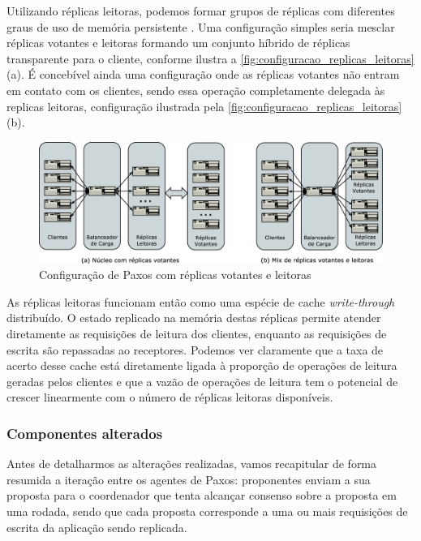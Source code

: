 Utilizando réplicas leitoras, podemos formar grupos de réplicas com diferentes graus de
uso de memória persistente \cite{aguilera00}. Uma configuração simples seria mesclar
réplicas votantes e leitoras formando um conjunto híbrido de réplicas transparente para o
cliente, conforme ilustra a \autoref{fig:configuracao_replicas_leitoras} (a). É concebível
ainda uma configuração onde as réplicas votantes não entram em contato com os clientes,
sendo essa operação completamente delegada às replicas leitoras, configuração ilustrada
pela \autoref{fig:configuracao_replicas_leitoras} (b).

\begin{figure}[ht]
  \begin{center}
    \includegraphics[width=16cm]{conteudo/capitulos/figuras/configuracao_replicas_leitoras.eps}
  \end{center}
  \caption{Configuração de Paxos com réplicas votantes e leitoras}
  \label{fig:configuracao_replicas_leitoras}
\end{figure}

As réplicas leitoras funcionam então como uma espécie de cache \emph{write-through}
distribuído. O estado replicado na memória destas réplicas permite atender diretamente as
requisições de leitura dos clientes, enquanto as requisições de escrita são repassadas ao
receptores. Podemos ver claramente que a taxa de acerto desse cache está diretamente
ligada à proporção de operações de leitura geradas pelos clientes e que a vazão de
operações de leitura tem o potencial de crescer linearmente com o número de réplicas
leitoras disponíveis.

\subsubsection{Componentes alterados}

Antes de detalharmos as alterações realizadas, vamos recapitular de forma resumida a
iteração entre os agentes de Paxos: proponentes enviam a sua proposta para o coordenador
que tenta alcançar consenso sobre a proposta em uma rodada, sendo que cada proposta
corresponde a uma ou mais requisições de escrita da aplicação sendo replicada.

